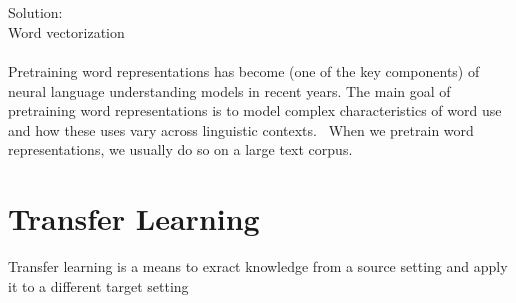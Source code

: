 \documentclass{report}
\begin{document}
\\\\
\noindent
Solution:
\\
Word vectorization
\\\\
\noindent
Pretraining word representations has become (one of the key components) of neural language understanding models in recent years. The main goal of pretraining word representations is to model complex characteristics of word use and how these uses vary across linguistic contexts.~\cite{https://www.aclweb.org/anthology/N18-1202.pdf}
When we pretrain word representations, we usually do so on a large text corpus. 
\section{Transfer Learning}
Transfer learning is a means to exract knowledge from a source setting and apply it to a different target setting
\end{document}
